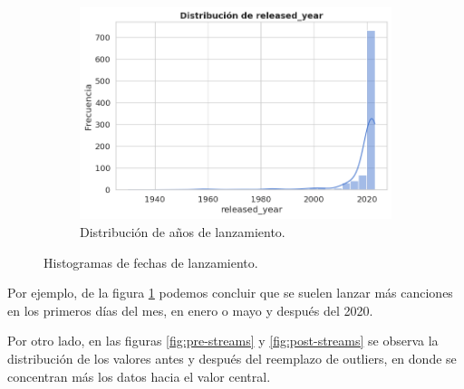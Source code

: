 \documentclass{article}
\begin{document}
\begin{figure}[h!]
		\hfill
		\begin{subfigure}[b]{0.5\linewidth}
			\centering
			\includegraphics[width=\linewidth]{./year_hist.png}
			\caption{Distribución de años de lanzamiento.}
		\end{subfigure}
		
		\caption{Histogramas de fechas de lanzamiento.}
		\label{fig:fechas_hist}
	\end{figure}
	
	\newpage
	Por ejemplo, de la figura \ref{fig:fechas_hist} podemos concluir que se suelen lanzar más canciones en los primeros días del mes, en enero o mayo y después del 2020.
	
	Por otro lado, en las figuras \ref{fig:pre-streams} y \ref{fig:post-streams} se observa la distribución de los valores antes y después del reemplazo de outliers, en donde se concentran más los datos hacia el valor central.
	
\end{document}
